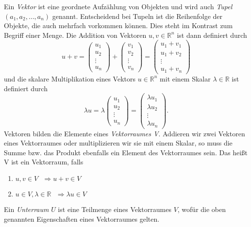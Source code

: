 Ein \textit{Vektor} ist eine geordnete Aufz\"ahlung von Objekten und wird auch \textit{Tupel} $(a_1, a_2,\dots,a_n)$ genannt. Entscheidend bei Tupeln ist die Reihenfolge der Objekte, die auch mehrfach vorkommen k\"onnen. Dies steht im Kontrast zum Begriff einer Menge. Die Addition von Vektoren $u, v\in\mathbb{R}^n$ ist dann definiert durch
\begin{equation*}
u + v = \begin{pmatrix} u_1 \\ u_2 \\ \vdots \\ u_n \end{pmatrix} + \begin{pmatrix} v_1 \\ v_2 \\ \vdots \\ v_n \end{pmatrix} = \begin{pmatrix} u_1 + v_1 \\ u_1+v_2 \\ \vdots \\ u_1+v_n \end{pmatrix}
\end{equation*} 
und die skalare Multiplikation eines Vektors $u\in\mathbb{R}^n$ mit einem Skalar $\lambda\in\mathbb{R}$ ist definiert durch
\begin{equation*}
\lambda u = \lambda \begin{pmatrix} u_1 \\ u_2 \\ \vdots \\ u_n \end{pmatrix} = \begin{pmatrix} \lambda u_1 \\ \lambda u_2 \\ \vdots \\ \lambda u_n \end{pmatrix}.
\end{equation*}
Vektoren bilden die Elemente eines \textit{Vektorraumes V}. Addieren wir zwei Vektoren eines Vektorraumes oder multiplizieren wir sie mit einem Skalar, so muss die Summe bzw. das Produkt ebenfalls ein Element des Vektorraumes sein. Das hei\ss t V ist ein Vektorraum, falls
\begin{enumerate}
\item $u, v \in V \text{ }\Rightarrow u+v \in V$
\item $u\in V, \lambda \in \mathbb{R} \text{ }\Rightarrow \lambda u \in V$
\end{enumerate}
\vspace{10pt}
Ein \emph{Unterraum} $U$ ist eine Teilmenge eines Vektorraumes $V$, wof\"ur die oben genannten Eigenschaften eines Vektorraumes gelten.

